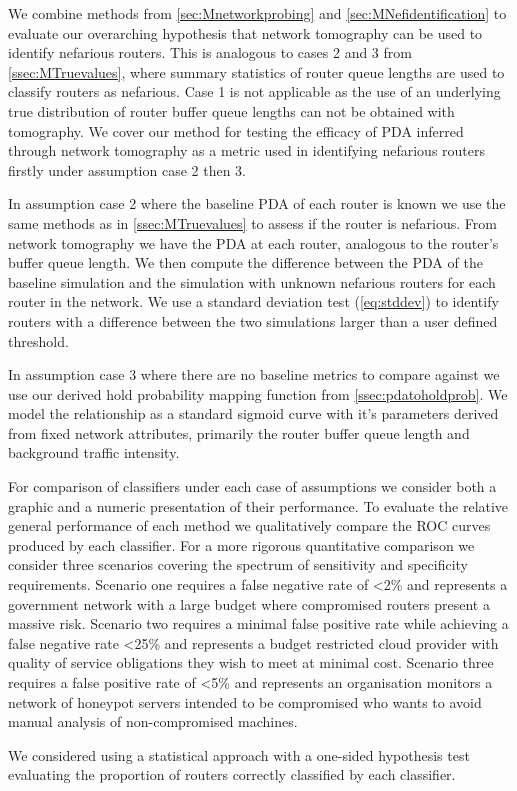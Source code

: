   We combine methods from \cref{sec:Mnetworkprobing} and \cref{sec:MNefidentification} to evaluate our overarching hypothesis that network tomography can be used to identify nefarious routers. This is analogous to cases 2 and 3 from \cref{ssec:MTruevalues}, where summary statistics of router queue lengths are used to classify routers as nefarious. Case 1 is not applicable as the use of an underlying true distribution of router buffer queue lengths can not be obtained with tomography. We cover our method for testing the efficacy of PDA inferred through network tomography as a metric used in identifying nefarious routers firstly under assumption case 2 then 3.\par
  In assumption case 2 where the baseline PDA of each router is known we use the same methods as in \cref{ssec:MTruevalues} to assess if the router is nefarious. From network tomography we have the PDA at each router, analogous to the router's buffer queue length. We then compute the difference between the PDA of the baseline simulation and the simulation with unknown nefarious routers for each router in the network. We use a standard deviation test (\cref{eq:stddev}) to identify routers with a difference between the two simulations larger than a user defined threshold.\par
  In assumption case 3 where there are no baseline metrics to compare against we use our derived hold probability mapping function from \cref{ssec:pdatoholdprob}. We model the relationship as a standard sigmoid curve with it's parameters derived from fixed network attributes, primarily the router buffer queue length and background traffic intensity.\par
  For comparison of classifiers under each case of assumptions we consider both a graphic and a numeric presentation of their performance. To evaluate the relative general performance of each method we qualitatively compare the ROC curves produced by each classifier. For a more rigorous quantitative comparison we consider three scenarios covering the spectrum of sensitivity and specificity requirements. Scenario one requires a false negative rate of <2\% and represents a government network with a large budget where compromised routers present a massive risk. Scenario two requires a minimal false positive rate while achieving a false negative rate <25\% and represents a budget restricted cloud provider with quality of service obligations they wish to meet at minimal cost. Scenario three requires a false positive rate of <5\% and represents an organisation monitors a network of honeypot servers intended to be compromised who wants to avoid manual analysis of non-compromised machines.\par
  We considered using a statistical approach with a one-sided hypothesis test evaluating the proportion of routers correctly classified by each classifier.  
  

